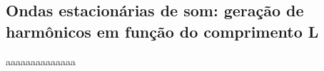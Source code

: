\subsection{Ondas estacionárias de som: geração de harmônicos em
função do comprimento L}

aaaaaaaaaaaaaa
